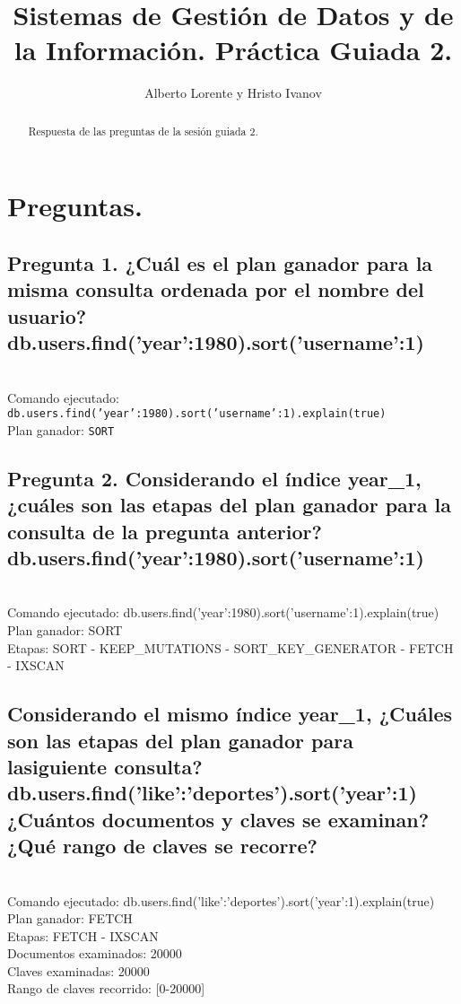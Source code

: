 \documentclass{article}
\begin{document}
\title{Sistemas de Gestión de Datos y de la Información. Práctica Guiada 2.}
\author{Alberto Lorente y Hristo Ivanov}
\maketitle

  \begin{abstract}
     Respuesta de las preguntas de la sesión guiada 2.
  \end{abstract}

  \section{Preguntas.}
    \subsection{Pregunta 1. ¿Cuál es el plan ganador para la misma consulta ordenada por el nombre del usuario? db.users.find({'year':1980}).sort({'username':1})} \\ 
     Comando ejecutado: \texttt{db.users.find({'year':1980}).sort({'username':1}).explain(true)} \\
     Plan ganador: \texttt{SORT} \\
    \subsection{Pregunta 2. Considerando el índice year_1, ¿cuáles son las etapas del plan ganador para la consulta de la pregunta anterior? db.users.find({'year':1980}).sort({'username':1})} \\
     Comando ejecutado: db.users.find({'year':1980}).sort({'username':1}).explain(true) \\
     Plan ganador: SORT \\ 
     Etapas: SORT - KEEP_MUTATIONS - SORT_KEY_GENERATOR - FETCH - IXSCAN \\
    \subsection{Considerando el mismo índice year_1, ¿Cuáles son las etapas del plan ganador para lasiguiente consulta? db.users.find({'like':'deportes'}).sort({'year':1}) ¿Cuántos documentos y claves se examinan? ¿Qué rango de claves se recorre?} \\
     Comando ejecutado: db.users.find({'like':'deportes'}).sort({'year':1}).explain(true) \\
     Plan ganador: FETCH \\
     Etapas: FETCH - IXSCAN \\
     Documentos examinados: 20000 \\
     Claves examinadas: 20000 \\
     Rango de claves recorrido: [0-20000] \\
\end{document}
